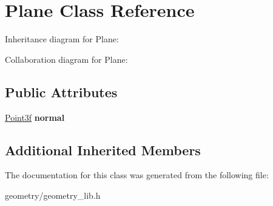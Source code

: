 \hypertarget{class_plane}{}\section{Plane Class Reference}
\label{class_plane}


Inheritance diagram for Plane\+:


Collaboration diagram for Plane\+:
\subsection*{Public Attributes}
\begin{DoxyCompactItemize}
\item 
\mbox{\label{class_plane_a0750005b0807c5ca32c264556d83a5d4}} 
\mbox{\hyperlink{struct_point3f}{Point3f}} {\bfseries normal}
\end{DoxyCompactItemize}
\subsection*{Additional Inherited Members}


The documentation for this class was generated from the following file\+:\begin{DoxyCompactItemize}
\item 
geometry/geometry\+\_\+lib.\+h\end{DoxyCompactItemize}
